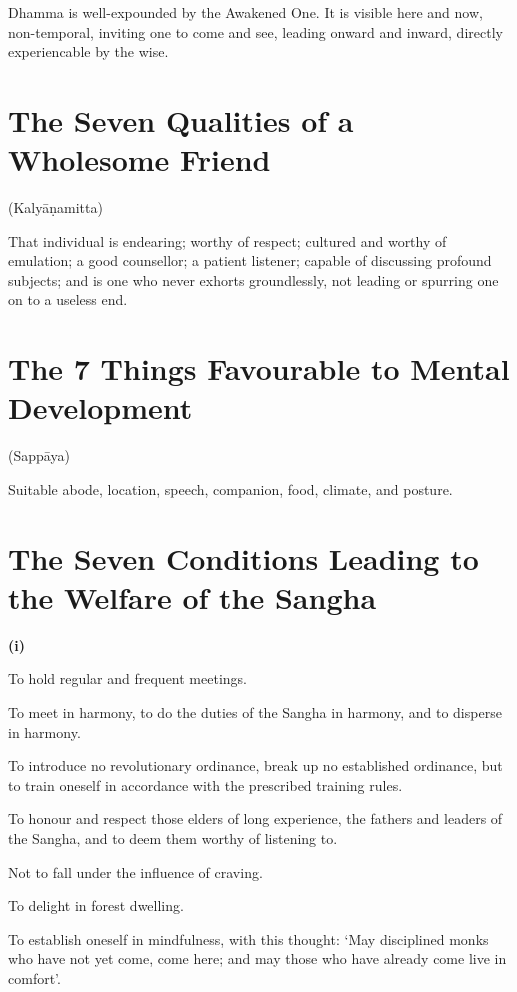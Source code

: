 Dhamma is well-expounded by the Awakened One. It is visible here and now,
non-temporal, inviting one to come and see, leading onward and inward, directly
experiencable by the wise.


\section{The Seven Qualities of a Wholesome Friend}

(Kalyāṇamitta)

That individual is endearing; worthy of respect; cultured and worthy of
emulation; a good counsellor; a patient listener; capable of discussing profound
subjects; and is one who never exhorts groundlessly, not leading or spurring one
on to a useless end.


\section[The Seven Favourable Things ]{The 7 Things Favourable to Mental Development}

(Sappāya)

Suitable abode, location, speech, companion, food, climate, and posture.


\section[The Seven Conditions for Welfare]{The Seven Conditions Leading to the Welfare of the Sangha}

\textbf{(i)}

To hold regular and frequent meetings.

To meet in harmony, to do the duties of the Sangha in harmony, and to disperse
in harmony.

To introduce no revolutionary ordinance, break up no established ordinance, but
to train oneself in accordance with the prescribed training rules.

To honour and respect those elders of long experience, the fathers and leaders
of the Sangha, and to deem them worthy of listening to.

Not to fall under the influence of craving.

To delight in forest dwelling.

To establish oneself in mindfulness, with this thought: ‘May disciplined monks
who have not yet come, come here; and may those who have already come live in
comfort’.

